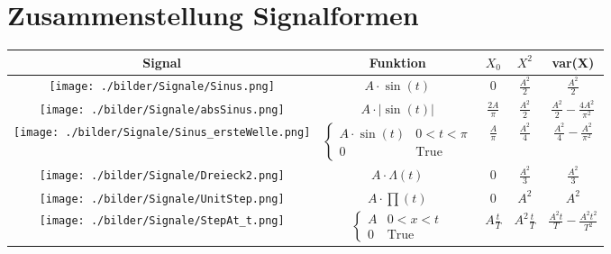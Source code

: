\section{Zusammenstellung Signalformen}
\begin{table}[htdp]
\begin{center}
\begin{tabular}{|c|c|c|c|c|}
\hline
\textbf{Signal} & \textbf{Funktion} & \textbf{$X_0$} & \textbf{$X^2$} & \textbf{var(X)} \\

\hline
\parbox[c][2.1cm]{3.5cm}{\texttt{[image: ./bilder/Signale/Sinus.png]}} &
$A\cdot\sin(t)$  & $0$ &
$\frac{A^2}{2}$ & $\frac{A^2}{2}$ \\

\hline
\parbox[c][2.1cm]{3.5cm}{\texttt{[image: ./bilder/Signale/absSinus.png]}} &
$A\cdot|\sin(t)|$  &
$\frac{2A}{\pi}$ & $\frac{A^2}{2}$ & $\frac{A^2}{2}-\frac{4A^2}{\pi^2}$\\

\hline
\parbox[c][2.1cm]{3.5cm}{\texttt{[image: ./bilder/Signale/Sinus\_ersteWelle.png]}} &
$\begin{cases} A\cdot\sin (t) & 0<t<\pi  \\ 0 & \text{True}\end{cases}$ & $\frac{A}{\pi}$ &
$\frac{A^2}{4}$ & $\frac{A^2}{4}-\frac{A^2}{\pi^2}$\\

\hline
\parbox[c][2.1cm]{3.5cm}{\texttt{[image: ./bilder/Signale/Dreieck2.png]}} &
$A\cdot\Lambda(t)$
& $0$ & $\frac{A^2}{3}$ &
$\frac{A^2}{3}$ \\

\hline
\parbox[c][2.1cm]{3.5cm}{\texttt{[image: ./bilder/Signale/UnitStep.png]}} &
$A\cdot\prod(t)$
& $0$ & $A^2$ & $A^2$ \\

\hline
\parbox[c][2.1cm]{3.5cm}{\texttt{[image: ./bilder/Signale/StepAt\_t.png]}} &
$\begin{cases} A & 0<x<t \\ 0 & \text{True}\end{cases}$ 
& $A\frac{t}{T}$ &
$A^2\frac{t}{T}$ & $\frac{A^2t}{T}-\frac{A^2t^2}{T^2}$ \\

\hline
\end{tabular}
\end{center}
\end{table}
